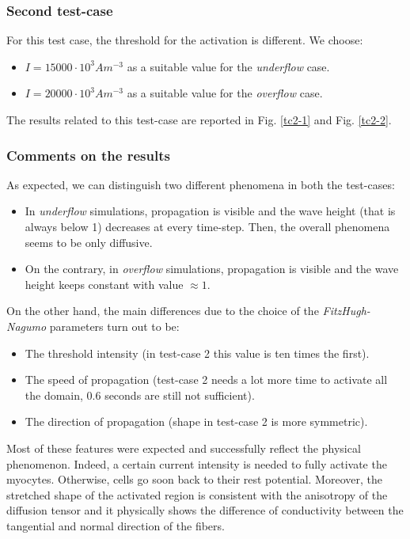 \documentclass[a4paper,11pt]{article}
\begin{document}
\subsubsection{Second test-case}
For this test case, the threshold for the activation is different. We choose:
\begin{itemize}
	\item $I = 15000 \cdot 10^3 Am^{-3}$ as a suitable value for the \emph{underflow} case.
	\item $I = 20000 \cdot 10^3 Am^{-3}$ as a suitable value for the \emph{overflow} case.
\end{itemize}

\noindent The results related to this test-case are reported in Fig. \ref{tc2-1} and Fig. \ref{tc2-2}.

\subsubsection{Comments on the results}
As expected, we can distinguish two different phenomena in both the test-cases:
\begin{itemize}
	\item In \emph{underflow} simulations, propagation is visible and the wave height (that is always below 1) decreases at every time-step. Then, the overall phenomena seems to be only diffusive.
	\item On the contrary, in \emph{overflow} simulations, propagation is visible and the wave height keeps constant with value $\approx 1$.  
\end{itemize}

\noindent On the other hand, the main differences due to the choice of the \emph{FitzHugh-Nagumo} parameters turn out to be:
\begin{itemize}
	\item The threshold intensity (in test-case 2 this value is ten times the first).
	\item The speed of propagation (test-case 2 needs a lot more time to activate all the domain, 0.6 seconds are still not sufficient).
	\item The direction of propagation (shape in test-case 2 is more symmetric).
\end{itemize}
 
\noindent Most of these features were expected and successfully reflect the physical phenomenon. Indeed, a certain current intensity is needed to fully activate the myocytes. Otherwise, cells go soon back to their rest potential. Moreover, the stretched shape of the activated region is consistent with the anisotropy of the diffusion tensor and it physically shows the difference of conductivity between the tangential and normal direction of the fibers.\\
\end{document}
